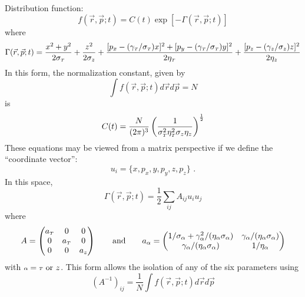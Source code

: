 Distribution function:
\begin{equation}
  f(\vec{r}, \vec{p}; t) = C(t)\exp \left[ - \Gamma(\vec{r}, \vec{p}; t) \right]
\end{equation}
where
\begin{equation}
  \Gamma(\vec{r}, \vec{p}; t) =
  \frac{x^2 + y^2}{2 \sigma_{{\scriptscriptstyle T}}} + \frac{z^2}{2 \sigma_{z}}
  + \frac{
    [p_x - (\gamma_{{\scriptscriptstyle T}}/\sigma_{{\scriptscriptstyle T}}) x ]^2 
    + [p_y - (\gamma_{{\scriptscriptstyle T}}/\sigma_{{\scriptscriptstyle T}}) y ]^2
  }{2 \eta_{{\scriptscriptstyle T}}}
  + \frac{ [p_z - (\gamma_{z}/\sigma_{z}) z ]^2 }{2 \eta_{z}}
\end{equation}
In this form, the normalization constant, given by
\begin{equation}
  \int f(\vec{r}, \vec{p}; t) d\vec{r} d\vec{p} = N
\end{equation}
is
\begin{equation}
  C(t) = \frac{N}{(2\pi)^3} 
  \left( 
    \frac{1}{\sigma_{{\scriptscriptstyle T}}^2\eta_{{\scriptscriptstyle T}}^2\sigma_{z}\eta_{z}}
  \right)^{\frac{1}{2}}
\end{equation}
These equations may be viewed from a matrix perspective if we define the ``coordinate vector'':
\begin{equation} \label{eq:coordinate_vector}
u_i = \{x, p_x, y, p_y, z, p_z\}\text{ .}
\end{equation}
In this space,
\begin{equation}
  \Gamma(\vec{r}, \vec{p}; t) = \frac{1}{2}\sum\limits_{ij} A_{ij} u_i u_j
\end{equation}
where
\begin{equation}
  A = 
  \begin{pmatrix}
    a_{{\scriptscriptstyle T}} & 0 & 0 \\
    0 & a_{{\scriptscriptstyle T}} & 0 \\
    0 & 0 & a_{z}
  \end{pmatrix}
  \qquad \text{and} \qquad
  a_{\alpha} = 
  \begin{pmatrix}
    1/\sigma_{\alpha} + \gamma_{\alpha}^2/(\eta_{\alpha} \sigma_{\alpha}) & \gamma_{\alpha}/(\eta_{\alpha} \sigma_{\alpha}) \\
    \gamma_{\alpha}/(\eta_{\alpha} \sigma_{\alpha}) & 1/\eta_{\alpha}
  \end{pmatrix}
\end{equation}
with ${\scriptstyle \alpha} = {\scriptscriptstyle T} \text{ or } z$. This form allows the isolation of any of the six parameters using
\begin{equation}
  (A^{-1})_{ij} = \frac{1}{N} \int f(\vec{r}, \vec{p}; t) d\vec{r} d\vec{p}
\end{equation}
